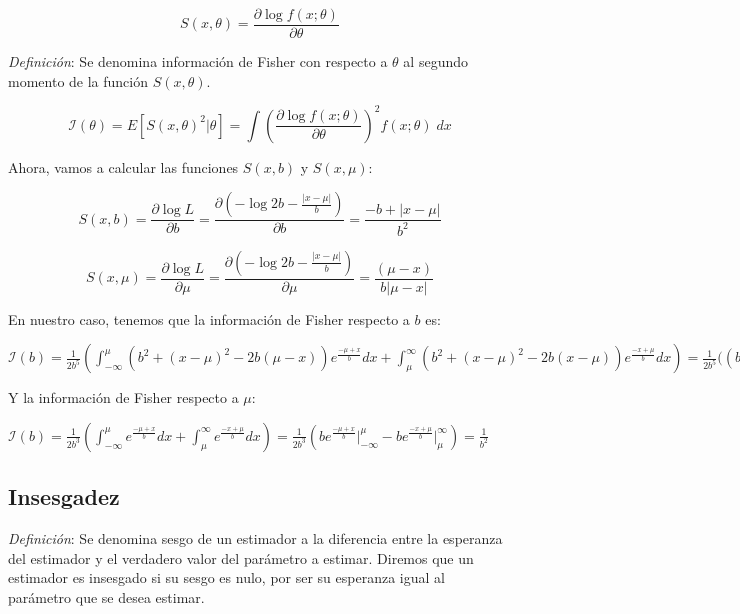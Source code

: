 \documentclass[a4paper, 10pt]{article} %
\begin{document}
$$S(x,\theta) = \frac{\partial \log f(x;\theta)}{\partial \theta}$$

\emph{Definición}: Se denomina información de Fisher con respecto a $\theta$ al segundo momento de la
función $S(x,\theta)$.

$$\mathcal{I}(\theta)=E\left[ S(x,\theta)^2 | \theta \right] = \int \left( \frac{\partial \log f(x;\theta)}
{\partial \theta} \right) ^ 2 f(x;\theta) \; dx $$

Ahora, vamos a calcular las funciones $S(x, b)$ y $S(x, \mu)$:

$$ S(x, b) = \frac{\partial \log L}{\partial b} = \frac{\partial (-\log 2b -\frac{|x-\mu|}{b})}
{\partial b} = \frac{-b+|x-\mu|}{b^2} $$

$$ S(x, \mu) = \frac{\partial \log L}{\partial \mu} = \frac{\partial (-\log 2b -\frac{|x-\mu|}{b})}
{\partial \mu} = \frac{(\mu-x)}{b|\mu-x|} $$

En nuestro caso, tenemos que la información de Fisher respecto a $b$ es:

$ \displaystyle \mathcal{I}(b) = \frac{1}{2b^5} \left(\int^\mu_{-\infty} \left( b^2+(x-\mu)^2-2b(\mu-x) \right) e^{\frac{-\mu+x}{b}} dx +
\int^\infty_{\mu} \left( b^2+(x-\mu)^2-2b(x-\mu) \right) e^{\frac{-x+\mu}{b}} dx \right) =
\frac{1}{2b^5} \bigg( (b^2+\mu^2-2b\mu) e^{\frac{-\mu+x}{b}} \Big|^\mu_{-\infty} +
(-2b-2\mu) b (x-b) e^{\frac{-\mu+x}{b}} \Big|^\mu_{-\infty} + (b^2+x^2-2bx) e^{\frac{-\mu+x}{b}} \Big|^\mu_{-\infty} -
(b^2+\mu^2+2b\mu) b e^{\frac{-x+\mu}{b}} \Big|^\infty_{\mu} - (-2b-2\mu) b (b+x) e^{\frac{-x+\mu}{b}} \Big|^\infty_{\mu} -
( 2b^2+x^2-2bx\mu ) b \frac{-\mu+x}{b} \Big|^\infty_{\mu} = 0
$

Y la información de Fisher respecto a $\mu$:

$ \displaystyle \mathcal{I}(b) = \frac{1}{2b^3} \left(\int^\mu_{-\infty} e^{\frac{-\mu+x}{b}} dx +
\int^\infty_{\mu} e^{\frac{-x+\mu}{b}} dx \right) =  \frac{1}{2b^3} \left( b e^{\frac{-\mu+x}{b}} \Big|^\mu_{-\infty} -
b e^{\frac{-x+\mu}{b}} \Big|^\infty_{\mu}\right) = \frac{1}{b^2}$

\subsection{Insesgadez}
\emph{Definición}: Se denomina sesgo de un estimador a la diferencia entre la esperanza del estimador
y el verdadero valor del parámetro a estimar. Diremos que un estimador es insesgado si su sesgo es nulo, por ser
su esperanza igual al parámetro que se desea estimar.
\end{document}
